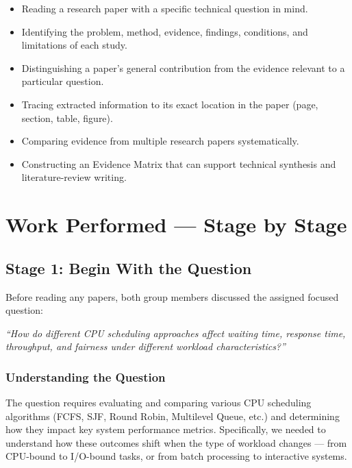 \documentclass[11pt, a4paper]{article}
\begin{document}
\begin{itemize}[nosep]
    \item Reading a research paper with a specific technical question in mind.
    \item Identifying the problem, method, evidence, findings, conditions, and limitations of each study.
    \item Distinguishing a paper's general contribution from the evidence relevant to a particular question.
    \item Tracing extracted information to its exact location in the paper (page, section, table, figure).
    \item Comparing evidence from multiple research papers systematically.
    \item Constructing an Evidence Matrix that can support technical synthesis and literature-review writing.
\end{itemize}

\section{Work Performed --- Stage by Stage}

\subsection{Stage 1: Begin With the Question}
Before reading any papers, both group members discussed the assigned focused question:

\textit{``How do different CPU scheduling approaches affect waiting time, response time, throughput, and fairness under different workload characteristics?''}

\subsubsection*{Understanding the Question}
The question requires evaluating and comparing various CPU scheduling algorithms (FCFS, SJF, Round Robin, Multilevel Queue, etc.) and determining how they impact key system performance metrics. Specifically, we needed to understand how these outcomes shift when the type of workload changes --- from CPU-bound to I/O-bound tasks, or from batch processing to interactive systems.
\end{document}
